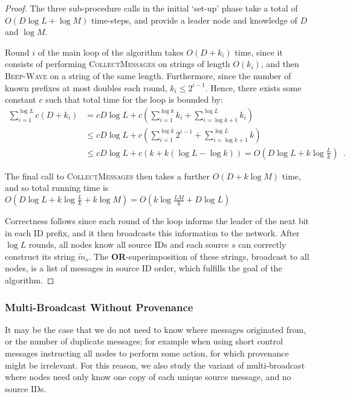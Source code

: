 \documentclass{article}
\begin{document}
\begin{proof}
	The three sub-procedure calls in the initial `set-up' phase take a total of $O(D \log L + \log M)$ time-steps, and provide a leader node and knowledge of $D$ and $\log M$.
	
	Round $i$ of the main loop of the algorithm takes $O(D+k_i)$ time, since it consists of performing \textsc{CollectMessages} on strings of length $O(k_i)$, and then \textsc{Beep-Wave} on a string of the same length. Furthermore, since the number of known prefixes at most doubles each round, $k_i \le 2^{i-1}$. Hence, there exists some constant $c$ such that total time for the loop is bounded by:
	\begin{align*}
	\sum_{i=1}^{\log L} c (D + k_i)
	& =
	c D \log L + c \left(\sum_{i=1}^{\log k} k_i + \sum_{i=\log k+1}^{\log L} k_i\right)\\
	&\le
	c D \log L + c \left(\sum_{i=1}^{\log k} 2^{i-1} + \sum_{i=\log k+1}^{\log L} k\right)
	\\
	& \le
	c D \log L + c(k + k(\log L - \log k))
	=
	O(D \log L + k \log \frac{L}{k})
	\enspace.
	\end{align*}
	
	The final call to \textsc{CollectMessages} then takes a further $O(D+ k \log M)$ time, and so total running time is $O(D \log L + k \log \frac{L}{k} + k \log M) = O(k \log \frac{LM}{k} + D \log L)$
	
	Correctness follows since each round of the loop informs the leader of the next bit in each ID prefix, and it then broadcasts this information to the network. After $\log L$ rounds, all nodes know all source IDs and each source $s$ can correctly construct its string $\tilde{m}_s$. The \textbf{OR}-superimposition of these strings, broadcast to all nodes, is a list of messages in source ID order, which fulfills the goal of the algorithm.
\end{proof}

\subsubsection{Multi-Broadcast Without Provenance}

It may be the case that we do not need to know where messages originated from, or the number of duplicate messages; for example when using short control messages instructing all nodes to perform some action, for which provenance might be irrelevant. For this reason, we also study the variant of multi-broadcast where nodes need only know one copy of each unique source message, and no source IDs.
\end{document}
